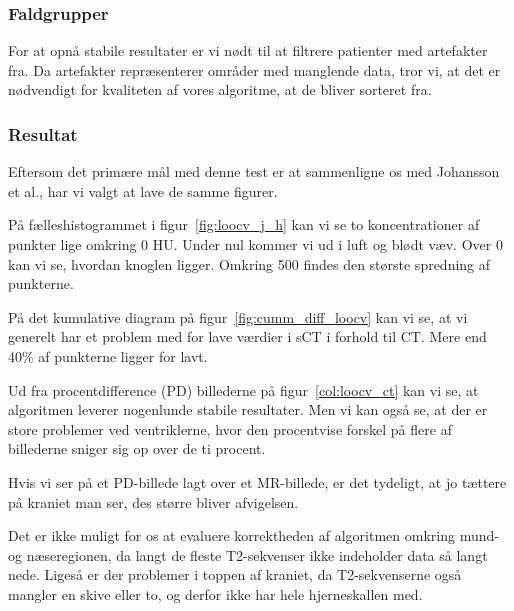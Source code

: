 \subsubsection{Faldgrupper}
For at opnå stabile resultater er vi nødt til at filtrere patienter med artefakter fra. Da artefakter repræsenterer områder med manglende data, tror vi, at det er nødvendigt for kvaliteten af vores algoritme, at de bliver sorteret fra.

\subsubsection{Resultat}

Eftersom det primære mål med denne test er at sammenligne os med Johansson et al., har vi valgt at lave de samme figurer.

På fælleshistogrammet i figur~\ref{fig:loocv_j_h} kan vi se to koncentrationer af punkter lige omkring 0 HU. Under nul kommer vi ud i luft og blødt væv. Over 0 kan vi se, hvordan knoglen ligger. Omkring 500 findes den største spredning af punkterne.

På det kumulative diagram på figur~\ref{fig:cumm_diff_loocv} kan vi se, at vi generelt har et problem med for lave værdier i sCT i forhold til CT. Mere end 40\% af punkterne ligger for lavt.

Ud fra procentdifference (PD) billederne på figur~\ref{col:loocv_ct}  kan vi se, at algoritmen leverer nogenlunde stabile resultater. Men vi kan også se, at der er store problemer ved ventriklerne, hvor den procentvise forskel på flere af billederne sniger sig op over de ti procent.

Hvis vi ser på et PD-billede lagt over et MR-billede, er det tydeligt, at jo tættere på kraniet man ser, des større bliver afvigelsen.

Det er ikke muligt for os at evaluere korrektheden af algoritmen omkring mund- og næseregionen, da langt de fleste T2-sekvenser ikke indeholder data så langt nede. Ligeså er der problemer i toppen af kraniet, da T2-sekvenserne også mangler en skive eller to, og derfor ikke har hele hjerneskallen med.


